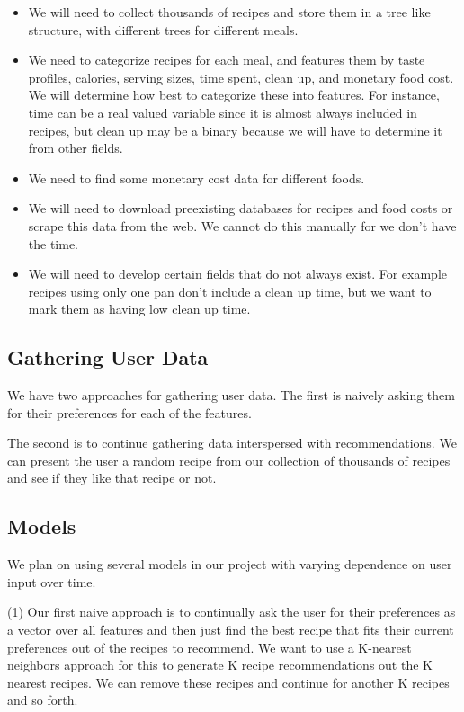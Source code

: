 \documentclass{article}
\begin{document}
    \begin{itemize}
        \item We will need to collect thousands of recipes and store them in a tree like structure, with different trees for different meals.
        \item We need to categorize recipes for each meal, and features them by taste profiles, calories, serving sizes, time spent, clean up, and monetary food cost. We will determine how best to categorize these into features. For instance, time can be a real valued variable since it is almost always included in recipes, but clean up may be a binary because we will have to determine it from other fields.
        \item We need to find some monetary cost data for different foods.
        \item We will need to download preexisting databases for recipes and food costs or scrape this data from the web. We cannot do this manually for we don't have the time.
        \item We will need to develop certain fields that do not always exist. For example recipes using only one pan don't include a clean up time, but we want to mark them as having low clean up time.
    \end{itemize}
    
    \subsection{Gathering User Data}
    
    We have two approaches for gathering user data. The first is naively asking them for their preferences for each of the features.
    
    The second is to continue gathering data interspersed with recommendations. We can present the user a random recipe from our collection of thousands of recipes and see if they like that recipe or not.
    
    \subsection{Models}
    
    We plan on using several models in our project with varying dependence on user input over time. 
    
    (1) Our first naive approach is to continually ask the user for their preferences as a vector over all features and then just find the best recipe that fits their current preferences out of the recipes to recommend. We want to use a K-nearest neighbors approach for this to generate K recipe recommendations out the K nearest recipes. We can remove these recipes and continue for another K recipes and so forth.
    
\end{document}
